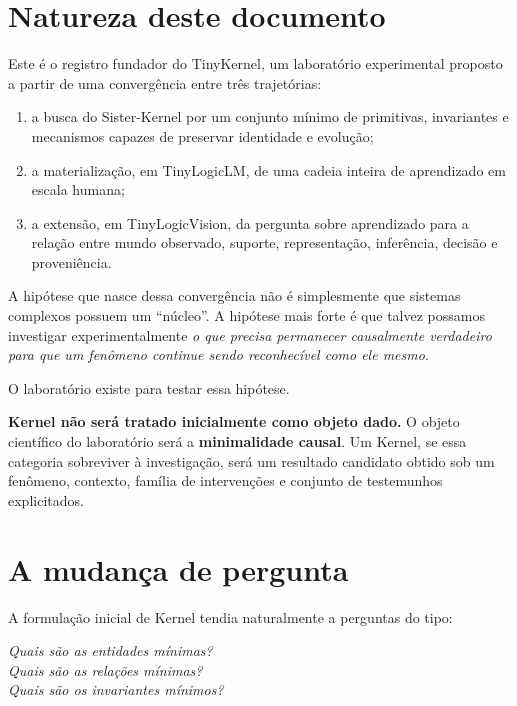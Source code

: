 \documentclass[11pt,a4paper]{article}
\newcommand{\TKProject}{TinyKernel}
\begin{document}
\section{Natureza deste documento}

Este é o registro fundador do \TKProject, um laboratório experimental proposto a
partir de uma convergência entre três trajetórias:

\begin{enumerate}
  \item a busca do Sister-Kernel por um conjunto mínimo de primitivas, invariantes e
  mecanismos capazes de preservar identidade e evolução;
  \item a materialização, em TinyLogicLM, de uma cadeia inteira de aprendizado em
  escala humana;
  \item a extensão, em TinyLogicVision, da pergunta sobre aprendizado para a relação
  entre mundo observado, suporte, representação, inferência, decisão e proveniência.
\end{enumerate}

A hipótese que nasce dessa convergência não é simplesmente que sistemas complexos
possuem um ``núcleo''. A hipótese mais forte é que talvez possamos investigar
experimentalmente \emph{o que precisa permanecer causalmente verdadeiro para que um
fenômeno continue sendo reconhecível como ele mesmo}.

O laboratório existe para testar essa hipótese.

\begin{thesisbox}
\textbf{Kernel não será tratado inicialmente como objeto dado.}
O objeto científico do laboratório será a \textbf{minimalidade causal}. Um Kernel,
se essa categoria sobreviver à investigação, será um resultado candidato obtido sob
um fenômeno, contexto, família de intervenções e conjunto de testemunhos explicitados.
\end{thesisbox}

\section{A mudança de pergunta}

A formulação inicial de Kernel tendia naturalmente a perguntas do tipo:

\begin{center}
\emph{Quais são as entidades mínimas?}\\
\emph{Quais são as relações mínimas?}\\
\emph{Quais são os invariantes mínimos?}
\end{center}
\end{document}
